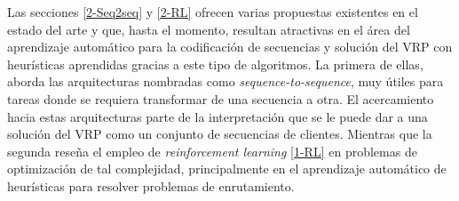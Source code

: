  Las secciones \ref{2-Seq2seq} y \ref{2-RL} ofrecen varias propuestas existentes en el estado del arte y que, hasta el momento, resultan atractivas en el área del aprendizaje automático para la codificación de secuencias y solución del VRP con heurísticas aprendidas gracias a este tipo de algoritmos. La primera de ellas, aborda las arquitecturas nombradas como \textit{sequence-to-sequence}, muy útiles para tareas donde se requiera transformar de una secuencia a otra.  El acercamiento hacia estas arquitecturas parte de la interpretación que se le puede dar a una solución del VRP como un conjunto de secuencias de clientes. Mientras que la segunda reseña el empleo de \textit{reinforcement learning} \ref{1-RL} en problemas de optimización de tal complejidad, principalmente en el aprendizaje automático de heurísticas para resolver problemas de enrutamiento. 











